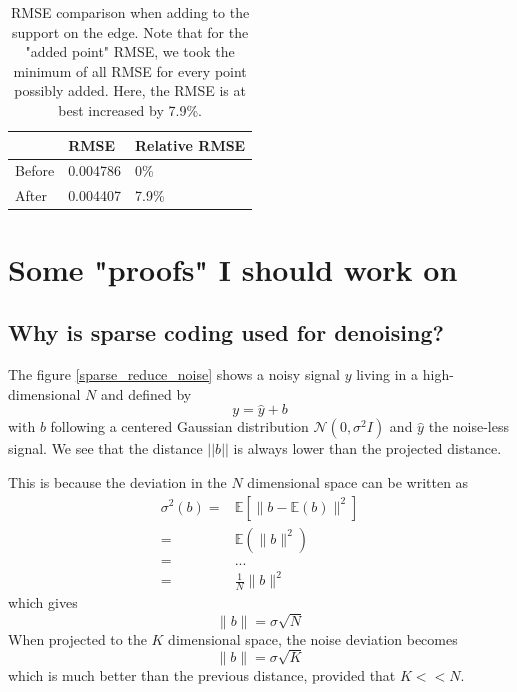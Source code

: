 \begin{table}[!h]\centering
\begin{tabular}{@{}lll@{}}\toprule
 & RMSE & Relative RMSE \\ \midrule
Before & 0.004786 & 0\% \\
After & 0.004407 & 7.9\% \\ \bottomrule
\end{tabular}
\caption{RMSE comparison when adding to the support on the  edge. Note that for the "added point" RMSE, we took the minimum of all RMSE for every point possibly added. Here, the RMSE is at best increased by 7.9\%.}
\end{table}



\clearpage
{}
\appendix

\chapter{Some "proofs" I should work on}

\section{Why is sparse coding used for denoising?}

The figure \ref{sparse_reduce_noise} shows a noisy signal $y$ living in a high-dimensional $N$ and defined by
$$y=\hat{y} + b$$
with $b$ following a centered Gaussian distribution $\mathcal{N}(0,\sigma^2I)$ and $\hat{y}$ the noise-less signal. We see that the distance $||b||$ is always lower than the projected distance.

This is because the deviation in the $N$ dimensional space can be written as
\begin{align*}
\sigma^2(b) =& \mathbb{E}\left[\lVert b-\mathbb{E}(b) \rVert^2 \right]\\
=& \mathbb{E}\left(\lVert b \rVert^2 \right)\\
=& ... \\
=& \frac{1}{N}\lVert b \rVert^2
\end{align*}
which gives 
$$ \lVert b \rVert = \sigma\sqrt{N} $$
When projected to the $K$ dimensional space, the noise deviation becomes
$$\lVert b \rVert = \sigma\sqrt{K} $$
which is much better than the previous distance, provided that $K<<N$. 

